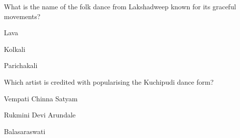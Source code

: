 \begin{enhancedmcq}{What is the name of the folk dance from Lakshadweep known for its graceful movements?}
\item Lava
\item Kolkali
\item Parichakali

\end{enhancedmcq}
\begin{enhancedmcq}{Which artist is credited with popularising the Kuchipudi dance form?}
\item Vempati Chinna Satyam
\item Rukmini Devi Arundale
\item Balasaraswati
\end{enhancedmcq}